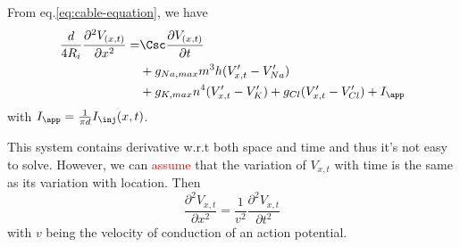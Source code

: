 
% 

From eq.\ref{eq:cable-equation}, we have
\begin{equation}
\begin{split}
  \frac{d}{4 R_i}\frac{\partial^2V_{(x,t)}}{\partial x^2} = & \Csc
  \frac{\partial V_{(x,t)}}{\partial t} \\
   &+ g_{Na,max} m^3h(V'_{x,t} - V'_{Na}) \\
   &+ g_{K,max}n^4 (V'_{x,t} - V'_{K})
  + g_{Cl} (V'_{x,t} - V'_{Cl}) + I_\app
\end{split}
\end{equation}
with $I_\app = \frac{1}{\pi d}I_\inj(x,t)$.

This system contains derivative w.r.t both space and time and thus
it's not easy to solve. However, we can \textcolor{red}{assume} that the
variation of $V_{x,t}$ with time is the same as its variation with location. Then
\begin{equation}
  \frac{\partial^2V_{x,t}}{\partial x^2} = \frac{1}{v^2} \frac{\partial^2V_{x,t}}{\partial t^2} 
\end{equation}
with $v$ being the velocity of conduction of an action potential.


